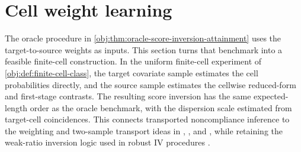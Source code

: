 \documentclass[11pt]{article}
\begin{document}
\section{Cell weight learning}

The oracle procedure in \cref{obj:thm:oracle-score-inversion-attainment} uses the target-to-source weights as inputs. This section turns that benchmark into a feasible finite-cell construction. In the uniform finite-cell experiment of \cref{obj:def:finite-cell-class}, the target covariate sample estimates the cell probabilities directly, and the source sample estimates the cellwise reduced-form and first-stage contrasts. The resulting score inversion has the same expected-length order as the oracle benchmark, with the dispersion scale estimated from target-cell coincidences. This connects transported noncompliance inference to the weighting and two-sample transport ideas in \citet{RudolphVanderLaan2017}, \citet{ChenHuang2025}, and \citet{ZengKennedyBodnarNaimi2024}, while retaining the weak-ratio inversion logic used in robust IV procedures \citep{ChoiGuShen2018,ChoiShen2019}.
\end{document}

